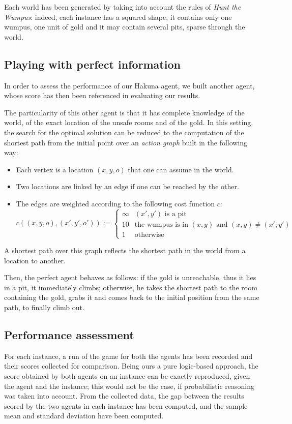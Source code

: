 \documentclass{llncs}
\newcommand{\htw}{\emph{Hunt the Wumpus}\xspace}
\begin{document}
Each world has been generated by taking into account the rules of \htw: indeed, each instance has a squared shape, it contains only one wumpus, one unit of gold and it may contain several pits, sparse through the world.

\subsection{Playing with perfect information}

In order to assess the performance of our Hakuna agent, we built another agent, whose score has then been referenced in evaluating our results.

The particularity of this other agent is that it has complete knowledge of the world, of the exact location of the unsafe rooms and of the gold.
In this setting, the search for the optimal solution can be reduced to the computation of the shortest path from the initial point over an \emph{action graph} built in the following way:
\begin{itemize}
	\item Each vertex is a location $(x,y,o)$ that one can assume in the world.
	\item Two locations are linked by an edge if one can be reached by the other.
	\item The edges are weighted according to the following cost function $c$:
	$$
	c((x, y, o), (x', y', o')) :=
	\begin{cases}
		\infty & (x', y') \text{ is a pit} \\
		10 & \text{the wumpus is in } (x,y) \text{ and } (x,y) \neq (x',y') \\
		1 & \text{otherwise}
	\end{cases}
	$$

\end{itemize}
A shortest path over this graph reflects the shortest path in the world from a location to another.

Then, the perfect agent behaves as follows: if the gold is unreachable, thus it lies in a pit, it immediately climbs; otherwise, he takes the shortest path to the room containing the gold, grabs it and comes back to the initial position from the same path, to finally climb out.

\subsection{Performance assessment}

For each instance, a run of the game for both the agents has been recorded and their scores collected for comparison.
Being ours a pure logic-based approach, the score obtained by both agents on an instance can be exactly reproduced, given the agent and the instance; this would not be the case, if probabilistic reasoning was taken into account.
From the collected data, the gap between the results scored by the two agents in each instance has been computed, and the sample mean and standard deviation have been computed.
\end{document}
